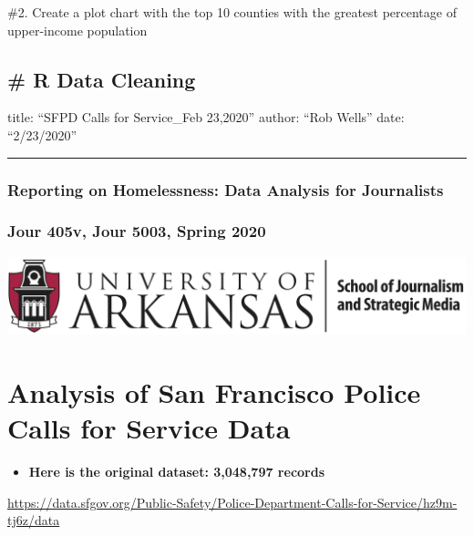 \documentclass[]{book}
\providecommand{\tightlist}{%
  \setlength{\itemsep}{0pt}\setlength{\parskip}{0pt}}
\begin{document}
\#2. Create a plot chart with the top 10 counties with the greatest percentage of upper-income population

\hypertarget{r-data-cleaning}{%
\section{\# R Data Cleaning}\label{r-data-cleaning}}

title: ``SFPD Calls for Service\_Feb 23,2020''
author: ``Rob Wells''
date: ``2/23/2020''

\begin{center}\rule{0.5\linewidth}{0.5pt}\end{center}

\hypertarget{reporting-on-homelessness-data-analysis-for-journalists}{%
\subsection{Reporting on Homelessness: Data Analysis for Journalists}\label{reporting-on-homelessness-data-analysis-for-journalists}}

\hypertarget{jour-405v-jour-5003-spring-2020}{%
\subsection{Jour 405v, Jour 5003, Spring 2020}\label{jour-405v-jour-5003-spring-2020}}

\includegraphics{Images/UARK logo NEW.png}

\hypertarget{analysis-of-san-francisco-police-calls-for-service-data}{%
\chapter{Analysis of San Francisco Police Calls for Service Data}\label{analysis-of-san-francisco-police-calls-for-service-data}}

\begin{itemize}
\tightlist
\item
  \textbf{Here is the original dataset: 3,048,797 records}
\end{itemize}

\url{https://data.sfgov.org/Public-Safety/Police-Department-Calls-for-Service/hz9m-tj6z/data}
\end{document}
